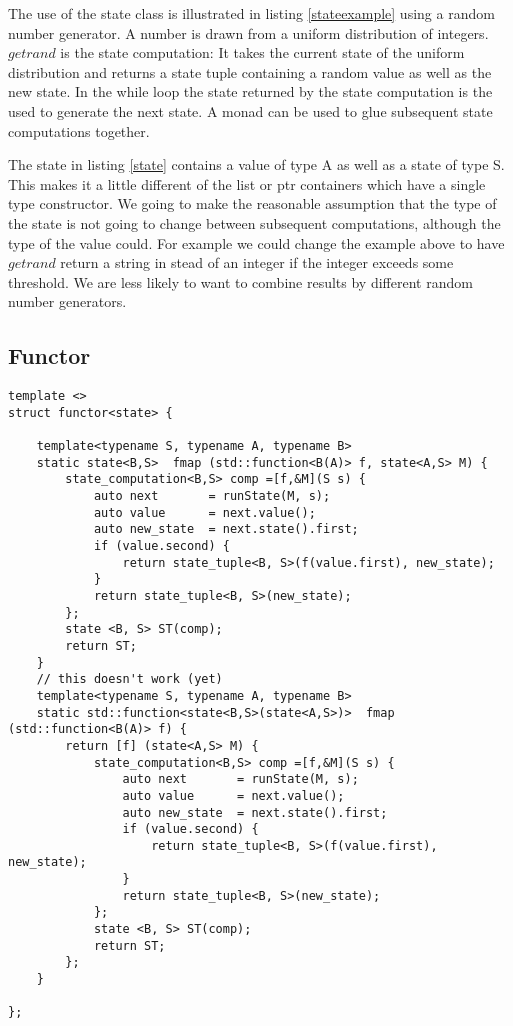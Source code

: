 \documentclass[12pt,fleqn]{article}
\begin{document}
The use of the state class is illustrated in listing \ref{stateexample} using a random number generator.
A number is drawn from a uniform distribution of integers.
$getrand$ is the state computation: It takes the current state of the uniform distribution and returns a state tuple containing a 
random value as well as the new state.
In the while loop the state returned by the state computation is the used to generate the next state. 
A monad can be used to glue subsequent state computations together. 

The state in listing \ref{state} contains a value of type A as well as a state of type S.
This makes it a little different of the list or ptr containers which have a single type constructor.
We going to make the reasonable assumption that the type of the state is not going to change between subsequent computations, although the type of the
value could.
For example we could change the example above to have $getrand$ return a string in stead of an integer if the integer exceeds some threshold.
We are less likely to want to combine results by different random number generators.

%
%
\subsection{Functor}
%

%
%
%
\begin{minipage}{\linewidth}
\begin{lstlisting}[caption=State functor,label=statefunctor]
template <>
struct functor<state> {

	template<typename S, typename A, typename B>
	static state<B,S>  fmap (std::function<B(A)> f, state<A,S> M) {
		state_computation<B,S> comp =[f,&M](S s) {
			auto next       = runState(M, s);
			auto value      = next.value();
			auto new_state  = next.state().first;
			if (value.second) {
				return state_tuple<B, S>(f(value.first), new_state);
			}
			return state_tuple<B, S>(new_state);
		};
		state <B, S> ST(comp);
		return ST;	
	}
	// this doesn't work (yet)
	template<typename S, typename A, typename B>
	static std::function<state<B,S>(state<A,S>)>  fmap (std::function<B(A)> f) {
		return [f] (state<A,S> M) {
			state_computation<B,S> comp =[f,&M](S s) {
				auto next       = runState(M, s);
				auto value      = next.value();
				auto new_state  = next.state().first;
				if (value.second) {
					return state_tuple<B, S>(f(value.first), new_state);
				}
				return state_tuple<B, S>(new_state);
			};
			state <B, S> ST(comp);
			return ST;	
		};
	}

};
\end{lstlisting}
\end{minipage}
%
%
%
\end{document}
